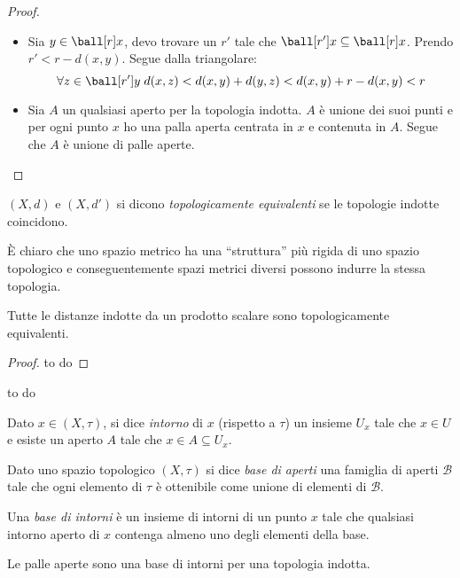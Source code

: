 \begin{proof}\noindent
\begin{itemize}
\item Sia $y \in \ball[r]x$, devo trovare un $r'$ tale che $\ball[r']x \subseteq \ball[r]x$. Prendo $r' < r-d(x,y)$. Segue dalla triangolare: 
\[\forall z \in \ball[r']y\; d(x,z) < d(x,y) + d(y,z) < d(x,y)  + r - d(x,y) < r\]
\item Sia $A$ un qualsiasi aperto per la topologia indotta. $A$ è unione dei suoi punti e per ogni punto $x$ ho una palla aperta centrata in $x$ e contenuta in $A$. Segue che $A$ è unione di palle aperte.
\end{itemize}
\end{proof}

\begin{defn}
$(X,d)$ e $(X,d')$ si dicono \emph{topologicamente equivalenti} se le topologie indotte coincidono.
\end{defn}

\begin{oss}
È chiaro che uno spazio metrico ha una ``struttura'' più rigida di uno spazio topologico e conseguentemente spazi metrici diversi possono indurre la stessa topologia.
\end{oss}

\begin{teo}
Tutte le distanze indotte da un prodotto scalare sono topologicamente equivalenti.
\end{teo}

\begin{proof}
to do
\end{proof}

\begin{es}
to do
\end{es}

\begin{defn}[Intorno]
Dato $x \in (X,\tau)$, si dice \emph{intorno} di $x$ (rispetto a $\tau$) un insieme $U_x$ tale che $x \in U$  e esiste un aperto $A$ tale che $x \in A \subseteq U_x$. 
\end{defn}

\begin{defn}
Dato uno spazio topologico $(X,\tau)$ si dice \emph{base di aperti} una famiglia di aperti $\mathcal B$ tale che ogni elemento di $\tau$ è ottenibile come unione di elementi di $\mathcal B$.
\end{defn}

\begin{defn}
Una \emph{base di intorni} è un insieme di intorni di un punto $x$ tale che qualsiasi intorno aperto di $x$ contenga almeno uno degli elementi della base.
\end{defn}

\begin{oss}
Le palle aperte sono una base di intorni per una topologia indotta.
\end{oss}